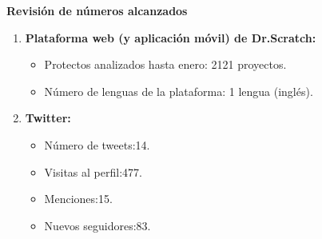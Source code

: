 \documentclass[a4paper,12pt]{letter}
\begin{document}
\begin{letter}
\textbf{{\LARGE Revisión de números alcanzados}}


\begin{enumerate}

    \item {\textbf {Plataforma web (y aplicación móvil) de Dr.Scratch:}}
        \begin{itemize}
            \item {Protectos analizados hasta enero: 2121 proyectos.}
            \item {Número de lenguas de la plataforma: 1 lengua (inglés).}
        \end{itemize}


    \item {\textbf {Twitter:}}
        \begin{itemize}
            \item {Número de tweets:14.}
            \item {Visitas al perfil:477.}
            \item {Menciones:15.}
            \item {Nuevos seguidores:83.}
        \end{itemize}


\end{enumerate}

\end{letter}
\end{document}
